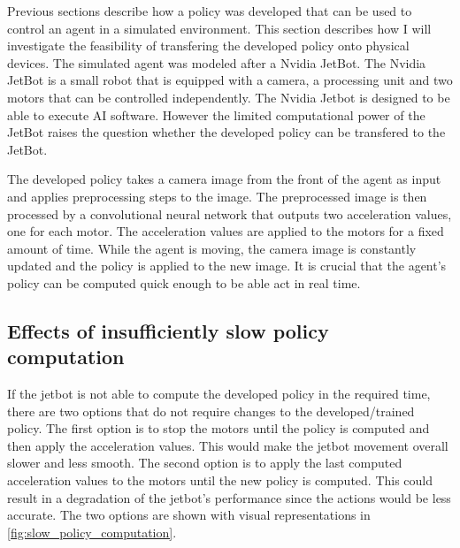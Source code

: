 Previous sections describe how a policy was developed that can be used to control an agent in a simulated environment. This section describes how I will investigate the feasibility of transfering the developed policy onto physical devices. The simulated agent was modeled after a Nvidia JetBot. The Nvidia JetBot is a small robot that is equipped with a camera, a processing unit and two motors that can be controlled independently. 
The Nvidia Jetbot is designed to be able to execute AI software. However the limited computational power of the JetBot raises the question whether the developed policy can be transfered to the JetBot. 

The developed policy takes a camera image from the front of the agent as input and applies preprocessing steps to the image. The preprocessed image is then processed by a convolutional neural network that outputs two acceleration values, one for each motor. The acceleration values are applied to the motors for a fixed amount of time. While the agent is moving, the camera image is constantly updated and the policy is applied to the new image. It is crucial that the agent's policy can be computed quick enough to be able act in real time. 

\subsection*{Effects of insufficiently slow policy computation}
If the jetbot is not able to compute the developed policy in the required time, there are two options that do not require changes to the developed/trained policy. The first option is to stop the motors until the policy is computed and then apply the acceleration values. This would make the jetbot movement overall slower and less smooth.
The second option is to apply the last computed acceleration values to the motors until the new policy is computed. This could result in a degradation of the jetbot's performance since the actions would be less accurate.
The two options are shown with visual representations in \ref{fig:slow_policy_computation}.




\newcommand{\spc}[2]{\subfigure[#1]{\texttt{[image: Bilder/slow\_policy\_computation/\#2.png]}}}

